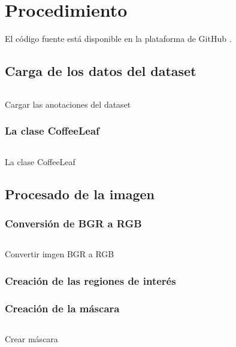 \chapter{Procedimiento}
El código fuente está disponible en la plataforma de GitHub \cite{LindermanDgz}.

\section{Carga de los datos del dataset}
\begin{listing}[!ht]
\inputminted{python}{code_listings/load_dataset.py}
\caption{Cargar las anotaciones del dataset}
\label{code:load_dataset}
\end{listing}

\subsection{La clase CoffeeLeaf}
\begin{listing}[!ht]
\inputminted{python}{code_listings/coffee_leaf.py}
\caption{La clase CoffeeLeaf}
\label{code:coffee_leaf}
\end{listing}

\section{Procesado de la imagen}

\subsection{Conversión de BGR a RGB}
\begin{listing}[!ht]
\inputminted{python}{code_listings/bgr_to_rgb.py}
\caption{Convertir imgen BGR a RGB}
\label{code:bgr_to_rgb}
\end{listing}

\subsection{Creación de las regiones de interés}

\subsection{Creación de la máscara}
\begin{listing}[!ht]
\inputminted{python}{code_listings/mask.py}
\caption{Crear máscara}
\label{code:mask}
\end{listing}

